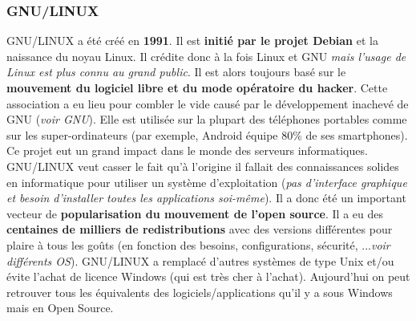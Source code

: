 \subsubsection{GNU/LINUX}

GNU/LINUX a été créé en \textbf{1991}. Il est \textbf{initié par le projet Debian} et la naissance du noyau Linux.
Il crédite donc à la fois Linux et GNU \textit{mais l'usage de Linux est plus connu au grand public}.
Il est alors toujours basé sur le \textbf{mouvement du logiciel libre et du mode opératoire du hacker}.
Cette association a eu lieu pour combler le vide causé par le développement inachevé de GNU (\textit{voir GNU}).
Elle est utilisée sur la plupart des téléphones portables comme sur les super-ordinateurs (par exemple, Android équipe 80\% de ses
smartphones). Ce projet eut un grand impact dans le monde des serveurs informatiques.
GNU/LINUX veut casser le fait qu'à l'origine il fallait des connaissances solides en informatique pour utiliser
 un système d'exploitation (\textit{pas d'interface graphique et besoin d'installer toutes les applications soi-même}).
 Il a donc été un important vecteur de \textbf{popularisation du mouvement de l'open source}.
Il a eu des \textbf{centaines de milliers de redistributions} avec des versions différentes pour plaire à tous les goûts
(en fonction des besoins, configurations, sécurité, ...\textit{voir différents OS}).
GNU/LINUX a remplacé d'autres systèmes de type Unix et/ou évite l'achat de licence Windows (qui est très cher à l'achat).
Aujourd'hui on peut retrouver tous les équivalents des logiciels/applications qu'il y a sous Windows mais en Open Source.\newline
